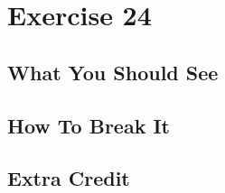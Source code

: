\chapter{Exercise 24}


\section{What You Should See}


\section{How To Break It}


\section{Extra Credit}



